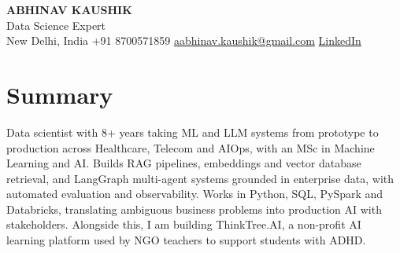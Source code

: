 \documentclass[10pt,a4paper]{article}
\begin{document}
\begin{center}
  {\LARGE\bfseries ABHINAV KAUSHIK}\\[2pt]
  {\large Data Science Expert}\\[2pt]
  New Delhi, India \textbar{} +91 8700571859 \textbar{} \href{mailto:aabhinav.kaushik@gmail.com}{aabhinav.kaushik@gmail.com} \textbar{} \href{https://www.linkedin.com/in/abhinav-kaushik10/}{LinkedIn}  
\end{center}

\section{Summary}
Data scientist with 8+ years taking ML and LLM systems from prototype to production across Healthcare, Telecom and AIOps, with an MSc in Machine Learning and AI. Builds RAG pipelines, embeddings and vector database retrieval, and LangGraph multi-agent systems grounded in enterprise data, with automated evaluation and observability. Works in Python, SQL, PySpark and Databricks, translating ambiguous business problems into production AI with stakeholders. Alongside this, I am building ThinkTree.AI, a non-profit AI learning platform used by NGO teachers to support students with ADHD.
\end{document}
